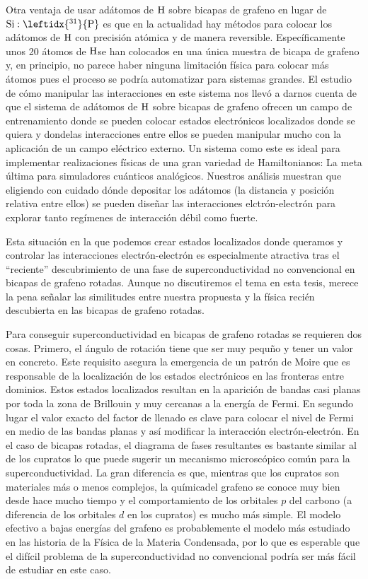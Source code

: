 Otra ventaja de usar adátomos de $\ce{H}$ sobre bicapas de grafeno en lugar de $\ce{Si}:\leftidx{^{31}}{\ce{P}}$ es que en la actualidad hay métodos para colocar los adátomos de $\ce{H}$ con precisión atómica y de manera reversible.\cite{elias2009,Brihuega2016,Brihuega2017} Específicamente unos 20 átomos de $\ce{H}$se han colocados en una única muestra de bicapa de grafeno y, en principio, no parece haber ninguna limitación física para colocar más átomos pues el proceso se podría automatizar para sistemas grandes.
\medskip
El estudio de cómo manipular las interacciones en este sistema nos llevó a darnos cuenta de que el sistema de adátomos de $\ce{H}$ sobre bicapas de grafeno ofrecen un campo de entrenamiento donde se pueden colocar estados electrónicos localizados donde se quiera y dondelas interacciones entre ellos se pueden manipular mucho con la aplicación de un campo eléctrico externo.
Un sistema como este es ideal para implementar realizaciones físicas de una gran variedad de Hamiltonianos: La meta última para simuladores cuánticos analógicos.
Nuestros análisis muestran que eligiendo con cuidado dónde depositar los adátomos (la distancia y posición relativa entre ellos) se pueden diseñar las interacciones elctrón-electrón para explorar tanto regímenes de interacción débil como fuerte.
\bigskip

Esta situación en la que podemos crear estados localizados donde queramos y controlar las interacciones electrón-electrón es especialmente atractiva tras el ``reciente'' descubrimiento de una fase de superconductividad no convencional en bicapas de grafeno rotadas\cite{Cao2018,Cao2018a}.
Aunque no discutiremos el tema en esta tesis, merece la pena señalar las similitudes entre nuestra propuesta y la física recién descubierta en las bicapas de grafeno rotadas.

Para conseguir superconductividad en bicapas de grafeno rotadas se requieren dos cosas. Primero, el ángulo de rotación tiene que ser muy pequño y tener un valor en concreto. Este requisito asegura la emergencia de un patrón de Moire que es responsable de la localización de los estados electrónicos en las fronteras entre dominios. Estos estados localizados resultan en la aparición de bandas casi planas por toda la zona de Brillouin y muy cercanas a la energía de Fermi. En segundo lugar el valor exacto del factor de llenado es clave para colocar el nivel de Fermi en medio de las bandas planas y así modificar la interacción electrón-electrón.
En el caso de bicapas rotadas, el diagrama de fases resultantes es bastante similar al de los cupratos lo que puede sugerir un mecanismo microscópico común para la superconductividad. La gran diferencia es que, mientras que los cupratos son materiales más o menos complejos, la químicadel grafeno se conoce muy bien desde hace mucho tiempo y el comportamiento de los orbitales $p$ del carbono (a diferencia de los orbitales $d$ en los cupratos) es mucho más simple.
El modelo efectivo a bajas energías del grafeno es probablemente el modelo más estudiado en las historia de la Física de la Materia Condensada, por lo que es esperable que el difícil problema de la superconductividad no convencional podría ser más fácil de estudiar en este caso.

